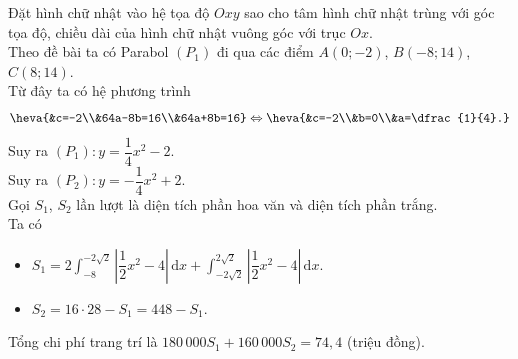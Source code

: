 \begin{bt}
{\begin{center}
		\end{center}
		Đặt  hình chữ nhật vào hệ tọa độ $Oxy$ sao cho tâm hình chữ nhật trùng với góc tọa độ, chiều dài của hình chữ nhật vuông góc với trục $Ox$.\\
		Theo đề bài ta có Parabol $(P_1)$ đi  qua các điểm $A(0;-2)$, $B(-8;14)$, $C(8;14)$.\\
		Từ đây ta  có hệ phương trình \[\heva{&c=-2\\&64a-8b=16\\&64a+8b=16}\Leftrightarrow \heva{&c=-2\\&b=0\\&a=\dfrac{1}{4}.}\]
		Suy ra  $(P_1)\colon y=\dfrac{1}{4}x^2-2$.\\
		Suy ra $(P_2)\colon y=-\dfrac{1}{4}x^2+2$.\\ 
		Gọi $S_1$, $S_2$ lần lượt là diện tích phần hoa văn và diện tích  phần trắng.\\
		Ta có 
		\begin{itemize}
			\item $S_1=2\displaystyle\int_{-8}^{-2\sqrt 2}\left|\dfrac{1}{2}x^2-4\right|\mathrm{\,d}x+\displaystyle\int_{-2\sqrt 2}^{2 \sqrt  2}\left|\dfrac{1}{2}x^2-4\right|\mathrm{\,d}x$.
			\item  $S_2=16\cdot 28-S_1=448-S_1$.
		\end{itemize}
		Tổng  chi phí trang trí là $180\,000S_1+160\,000S_2=74{,}4$ (triệu đồng).
	} 
\end{bt}

